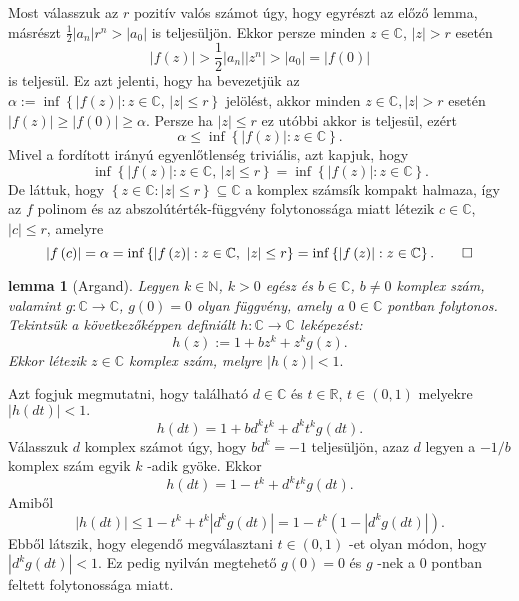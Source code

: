 \documentclass[9pt, showtrims]{memoir}
\makeatletter
\renewenvironment{proof}[1][\proofname]
    {\par\pushQED{\qed}%
    \normalfont \topsep6\p@\@plus6\p@\relax
    \trivlist
    \item[\hskip\labelsep
        \itshape
    #1\@addpunct{:}]\ignorespaces}
    {\popQED\endtrivlist\@endpefalse}
\theoremstyle{plain}
\newtheorem{lemma}[proposition]{lemma}
\theoremstyle{remark}
\theoremstyle{definition}
\makeatother
\begin{document}
\begin{proof}
Most válasszuk az $r$ pozitív valós számot úgy, hogy egyrészt az előző lemma, másrészt $\frac{1}{2}\left|
a_{n}\right| r^{n}>\left| a_{0}\right| $ is teljesüljön.
Ekkor
persze minden $z\in \mathbb{C}$, $\left| z\right| >r$ esetén 
\[
\left| f\left( z\right) \right| >\frac{1}{2}\left| a_{n}\right| \left|
z^{n}\right| >\left| a_{0}\right| =\left| f\left( 0\right) \right| 
\]
is teljesül.
Ez azt jelenti, hogy ha bevezetjük az $\alpha :=\inf \left\{ \left|
f\left( z\right) \right| :z\in \mathbb{C}\text{, }\left| z\right| \leq
r\right\} $ jelölést, akkor minden $z\in \mathbb{C},\left| z\right| >r$
esetén $\left| f\left( z\right) \right| \geq \left| f\left( 0\right)
\right| \geq \alpha .$ Persze ha $\left| z\right| \leq r$ ez utóbbi
akkor is teljesül, ezért 
\[
\alpha \leq \inf \left\{ \left| f\left( z\right) \right| :z\in \mathbb{C}\right\} .
\]
Mivel a fordított irányú egyenlőtlenség triviális,
azt kapjuk, hogy 
\[
\inf \left\{ \left| f\left( z\right) \right| :z\in \mathbb{C}\text{, }\left|
z\right| \leq r\right\} =\inf \left\{ \left| f\left( z\right) \right| :z\in 
\mathbb{C}\right\} .
\]
De láttuk, hogy $\left\{ z\in \mathbb{C}:\left| z\right| \leq r\right\}
\subseteq \mathbb{C}$ a komplex számsík kompakt halmaza, így az $f$
polinom és az abszolútérték-függvény folytonossága miatt létezik $c\in \mathbb{C}$, $\left| c\right| \leq r$, amelyre 
\[
\left| f\left( c\right) \right| =\alpha =\inf \left\{ \left| f\left(
z\right) \right| :z\in \mathbb{C}\text{, }\left| z\right| \leq r\right\} =\inf
\left\{ \left| f\left( z\right) \right| :z\in \mathbb{C}\right\}. \qedhere
\]
\end{proof}

\begin{lemma}[Argand]
\label{Th:Argand}Legyen $k\in \mathbb{N}$, $k>0$ egész és $b\in \mathbb{C}$, $b\neq 0$ komplex szám, valamint $g:\mathbb{C}\rightarrow \mathbb{C}$, $g\left( 0\right) =0$ olyan függvény, amely a $0\in \mathbb{C}$ pontban
folytonos.
Tekintsük a következőképpen definiált $h:\mathbb{C}\rightarrow \mathbb{C}$ leképezést: 
\[
h\left( z\right) :=1+bz^{k}+z^{k}g\left( z\right) .
\]
Ekkor létezik $z\in \mathbb{C}$ komplex szám, melyre $\left| h\left(
z\right) \right| <1.$
\end{lemma}

\begin{proof}
Azt fogjuk megmutatni, hogy található $d\in \mathbb{C}$ és $t\in 
\mathbb{R}$, $t\in \left( 0,1\right) $ melyekre $\left| h\left( dt\right)
\right| <1.$\[
h\left( dt\right) =1+bd^{k}t^{k}+d^{k}t^{k}g\left( dt\right) .
\]
Válasszuk $d$ komplex számot úgy, hogy $bd^{k}=-1$ teljesüljön, azaz $d$ legyen a $-1/b$ komplex szám egyik $k$ -adik gyöke.
Ekkor 
\[
h\left( dt\right) =1-t^{k}+d^{k}t^{k}g\left( dt\right) .
\]
Amiből 
\[
\left| h\left( dt\right) \right| \leq 1-t^{k}+t^{k}\left| d^{k}g\left(
dt\right) \right| =1-t^{k}\left( 1-\left| d^{k}g\left( dt\right) \right|
\right) .
\]
Ebből látszik, hogy elegendő megválasztani $t\in \left(
0,1\right) $ -et olyan módon, hogy $\left| d^{k}g\left( dt\right)
\right| <1.$ Ez pedig nyilván megtehető $g\left( 0\right) =0$ és 
$g$ -nek a $0$ pontban feltett folytonossága miatt.
\end{proof}
\end{document}
